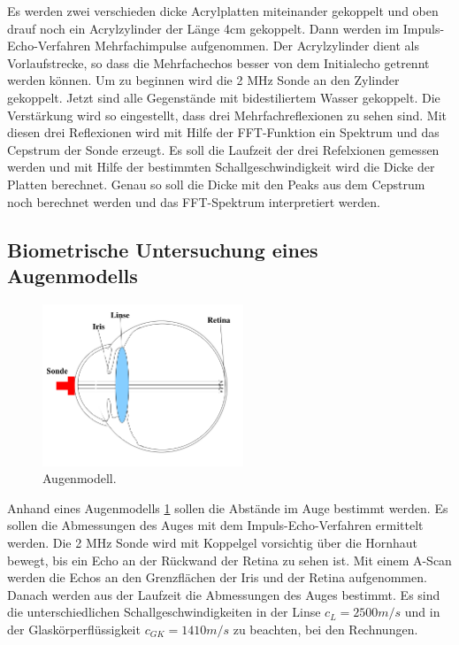 Es werden zwei verschieden dicke Acrylplatten miteinander gekoppelt und oben drauf noch ein Acrylzylinder der Länge 4cm gekoppelt.
Dann werden im Impuls-Echo-Verfahren Mehrfachimpulse aufgenommen.
Der Acrylzylinder dient als Vorlaufstrecke, so dass die Mehrfachechos besser von dem Initialecho getrennt werden können.
Um zu beginnen wird die 2 MHz Sonde an den Zylinder gekoppelt.
Jetzt sind alle Gegenstände mit bidestiliertem Wasser gekoppelt.
Die Verstärkung wird so eingestellt, dass drei Mehrfachreflexionen zu sehen sind.
Mit diesen drei Reflexionen wird mit Hilfe der FFT-Funktion ein Spektrum und das Cepstrum der Sonde erzeugt.
Es soll die Laufzeit der drei Refelxionen gemessen werden und mit Hilfe der bestimmten Schallgeschwindigkeit wird die Dicke der Platten berechnet.
Genau so soll die Dicke mit den Peaks aus dem Cepstrum noch berechnet werden und das FFT-Spektrum interpretiert werden.

\subsection{Biometrische Untersuchung eines Augenmodells}
\label{sec:auge}

\begin{figure}
    \centering
    \includegraphics[width=6cm]{data/abb1.png}
    \caption{Augenmodell.}
    \label{fig:modell}
  \end{figure}
  \FloatBarrier

Anhand eines Augenmodells \ref{fig:modell} sollen die Abstände im Auge bestimmt werden.
Es sollen die Abmessungen des Auges mit dem Impuls-Echo-Verfahren ermittelt werden.
Die 2 MHz Sonde wird mit Koppelgel vorsichtig über die Hornhaut bewegt, bis ein Echo an der Rückwand der Retina zu sehen ist.
Mit einem A-Scan werden die Echos an den Grenzflächen der Iris und der Retina aufgenommen.
Danach werden aus der Laufzeit die Abmessungen des Auges bestimmt.
Es sind die unterschiedlichen Schallgeschwindigkeiten in der Linse $c_L = 2500 m/s$ und in der Glaskörperflüssigkeit $c_{GK} = 1410 m/s$ zu beachten, bei den Rechnungen.